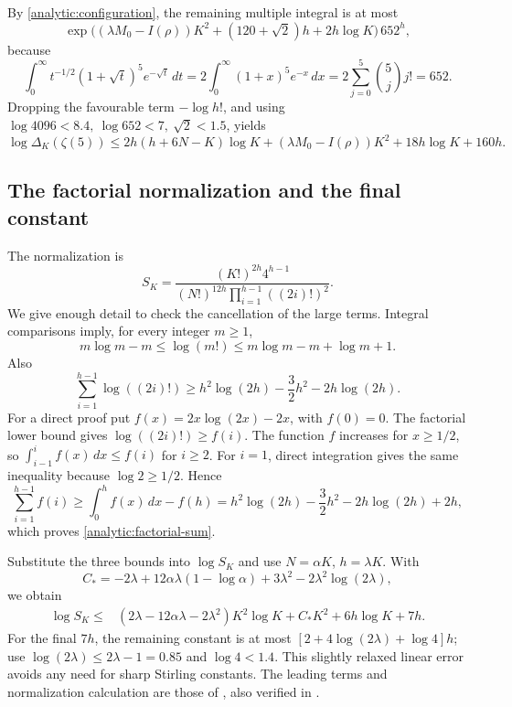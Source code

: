 By \eqref{analytic:configuration}, the remaining multiple integral is
at most
\[
 \exp\bigl((\lambda M_0-I(\rho))K^2
                      +(120+\sqrt2)h+2h\log K\bigr)\,652^h,
\]
because
\[
 \int_0^\infty t^{-1/2}(1+\sqrt t)^5e^{-\sqrt t}\,dt
 =2\int_0^\infty(1+x)^5e^{-x}\,dx
 =2\sum_{j=0}^5\binom5j j!=652.
\]
Dropping the favourable term \(-\log h!\), and using
\(\log4096<8.4,\ \log652<7,\ \sqrt2<1.5\), yields
\begin{equation}\label{analytic:delta-bound}
 \log\Delta_K(\zeta(5))
 \leq2h(h+6N-K)\log K+(\lambda M_0-I(\rho))K^2
                         +18h\log K+160h.
\end{equation}

\subsection{The factorial normalization and the final constant}

The normalization is
\[
 S_K=\frac{(K!)^{2h}4^{h-1}}
              {(N!)^{12h}\prod_{i=1}^{h-1}((2i)!)^2}.
\]
We give enough detail to check the cancellation of the large terms.
Integral comparisons imply, for every integer \(m\geq1\),
\[
 m\log m-m\leq\log(m!)
       \leq m\log m-m+\log m+1.
\]
Also
\begin{equation}\label{analytic:factorial-sum}
 \sum_{i=1}^{h-1}\log((2i)!)
       \geq h^2\log(2h)-\frac32h^2-2h\log(2h).
\end{equation}
For a direct proof put \(f(x)=2x\log(2x)-2x\), with \(f(0)=0\).
The factorial lower bound gives \(\log((2i)!)\geq f(i)\).
The function \(f\) increases for \(x\geq1/2\), so
\(\int_{i-1}^{i}f(x)\,dx\leq f(i)\) for \(i\geq2\).
For \(i=1\), direct integration gives the same inequality because
\(\log2\geq1/2\). Hence
\[
 \sum_{i=1}^{h-1}f(i)
 \geq\int_0^h f(x)\,dx-f(h)
 =h^2\log(2h)-\frac32h^2-2h\log(2h)+2h,
\]
which proves \eqref{analytic:factorial-sum}.

Substitute the three bounds into \(\log S_K\) and use \(N=\alpha K\),
\(h=\lambda K\). With
\begin{equation}\label{analytic:cstar}
 C_*=-2\lambda+12\alpha\lambda(1-\log\alpha)
                    +3\lambda^2-2\lambda^2\log(2\lambda),
\end{equation}
we obtain
\begin{align}
 \log S_K\leq{}&
 (2\lambda-12\alpha\lambda-2\lambda^2)K^2\log K+C_*K^2
                       +6h\log K+7h. \label{analytic:s-bound}
\end{align}
For the final \(7h\), the remaining constant is at most
\([2+4\log(2\lambda)+\log4]h\); use
\(\log(2\lambda)\leq2\lambda-1=0.85\) and \(\log4<1.4\).
This slightly relaxed linear error avoids any need for sharp Stirling
constants. The leading terms and normalization calculation are those of
\cite[(6.3), (6.15)]{fauzan}, also verified in
\cite[\texttt{Apery/RealBound.lean}, \texttt{log\_S\_le}]{firsching}.

